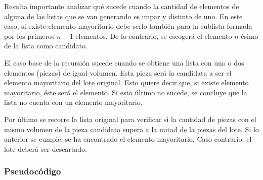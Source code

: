 \documentclass{article}
\begin{document}
Resulta importante analizar qué sucede cuando la cantidad de elementos de alguna de las listas que se van generando es impar y distinto de uno. 
En este caso, si existe elemento mayoritario debe serlo también para la sublista formada por los primeros \(n-1\) elementos. 
De lo contrario, se escogerá el elemento \(n\)-ésimo de la lista como candidato.

El caso base de la recursión sucede cuando se obtiene una lista con uno o dos elementos (piezas) de igual volumen. 
Esta pieza será la candidata a ser el elemento mayoritario del lote original. Esto quiere decir que, si existe elemento mayoritario, éste será el elemento. 
Si esto último no sucede, se concluye que la lista no cuenta con un elemento mayoritario.

Por último se recorre la lista original para verificar si la cantidad de piezas con el mismo volumen de la pieza candidata supera a la mitad de la piezas del lote. 
Si lo anterior se cumple, se ha encontrado el elemento mayoritario. 
Caso contrario, el lote deberá ser descartado.


\subsubsection{Pseudocódigo}
\end{document}
